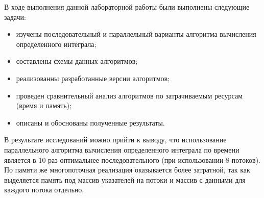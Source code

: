 
В ходе выполнения данной лабораторной работы были выполнены следующие задачи:
\begin{itemize}
	\item изучены последовательный и параллельный варианты алгоритма вычисления определенного интеграла;
	\item составлены схемы данных алгоритмов;
	\item реализованны разработанные версии алгоритмов;
	\item проведен сравнительный анализ алгоритмов по затрачиваемым ресурсам (время и память);
	\item описаны и обоснованы полученные результаты.
\end{itemize}

В результате исследований можно прийти к выводу, что использование параллельного алгоритма вычисления определенного интеграла по времени является в 10 раз оптимальнее последовательного (при использовании 8 потоков). По памяти же многопоточная реализация оказывается более затратной, так как выделяется память под массив указателей на потоки и массив с данными для каждого потока отдельно.